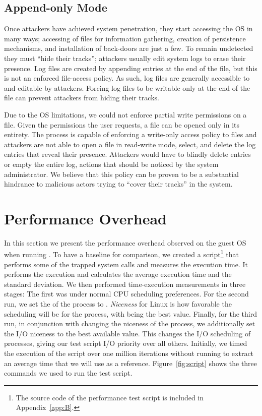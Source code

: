 \subsection{Append-only Mode}

\par Once attackers have achieved system penetration, they start accessing the \ac{OS} in many ways; accessing of files for information gathering, creation of persistence mechanisms, and installation of back-doors are just a few. To remain undetected they must ``hide their tracks''; attackers usually edit system logs to erase their presence. Log files are created by appending entries at the end of the file, but this is not an enforced file-access policy. As such, log files are generally accessible to and editable by attackers. Forcing log files to be writable only at the end of the file can prevent attackers from hiding their tracks.

\par Due to the \ac{OS} limitations, we could not enforce partial write permissions on a file. Given the permissions the user requests, a file can be opened only in its entirety. The  process is capable of enforcing a write-only access policy to files and attackers are not able to open a file in read-write mode, select, and delete the log entries that reveal their presence. Attackers would have to blindly delete entries or empty the entire log, actions that should be noticed by the system administrator. We believe that this policy can be proven to be a substantial hindrance to malicious actors trying to ``cover their tracks'' in the system.

\section{Performance Overhead}\label{sec:performance}

In this section we present the performance overhead observed on the guest \ac{OS} when running . To have a baseline for comparison, we created a  script\footnote{The source code of the performance test script is included in Appendix~\ref{app:B}.} that performs some of the trapped system calls and measures the execution time. It performs the execution and calculates the average execution time and the standard deviation. We then performed time-execution measurements in three stages: The first was under normal \ac{CPU} scheduling preferences. For the second run, we set the  of the process to . \emph{Niceness} for Linux is how favorable the scheduling will be for the process, with  being the best value. Finally, for the third run, in conjunction with changing the niceness of the process, we additionally set the \ac{I/O} niceness to the best available value. This changes the \ac{I/O} scheduling of processes, giving our test script \ac{I/O} priority over all others. Initially, we timed the execution of the script over one million iterations without running  to extract an average time that we will use as a reference. Figure~\ref{fig:script} shows the three commands we used to run the test script.

